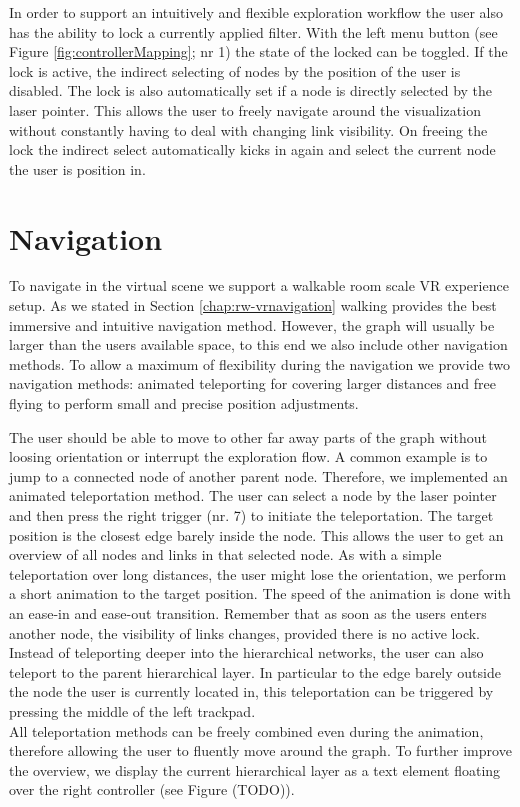 In order to support an intuitively and flexible exploration workflow the user also has the ability to lock a currently applied filter.
With the left menu button (see Figure \ref{fig:controllerMapping}; nr 1) the state of the locked can be toggled. 
If the lock is active, the indirect selecting of nodes by the position of the user is disabled. The lock is also automatically set if a node is directly selected by the laser pointer. 
This allows the user to freely navigate around the visualization without constantly having to deal with changing link visibility. 
On freeing the lock the indirect select automatically kicks in again and select the current node the user is position in.

\section{Navigation}
\label{chap:solution-navigation}
To navigate in the virtual scene we support a walkable room scale VR experience setup. As we stated in Section \ref{chap:rw-vrnavigation} walking provides the best immersive and intuitive navigation method.
However, the graph will usually be larger than the users available space, to this end we also include other navigation methods.
To allow a maximum of flexibility during the navigation we provide two navigation methods: animated teleporting for covering larger distances and free flying to perform small and precise position adjustments.

The user should be able to move to other far away parts of the graph without loosing orientation or interrupt the exploration flow. A common example is to jump to a connected node of another parent node. 
Therefore, we implemented an animated teleportation method. The user can select a node by the laser pointer and then press the right trigger (nr. 7) to initiate the teleportation. The target position is the closest edge barely inside the node. This allows the user to get an overview of all nodes and links in that selected node.   
As with a simple teleportation over long distances, the user might lose the orientation, we perform a short animation to the target position. The speed of the animation is done with an ease-in and ease-out transition.
Remember that as soon as the users enters another node, the visibility of links changes, provided there is no active lock.\\
Instead of teleporting deeper into the hierarchical networks, the user can also teleport to the parent hierarchical layer. In particular to the edge barely outside the node the user is currently located in, this teleportation can be triggered by pressing the middle of the left trackpad.\\
All teleportation methods can be freely combined even during the animation, therefore allowing the user to fluently move around the graph. 
To further improve the overview, we display the current hierarchical layer as a text element floating over the right controller (see Figure (TODO)). 

